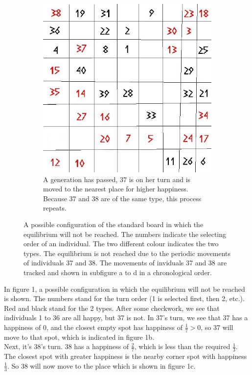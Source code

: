 \begin{figure}[H]
\begin{subfigure}{0.3\textwidth}
        \includegraphics[width=\textwidth]{Tegenvoorbeeld/segregation_tegenvb_3.jpg}
        
        \caption{A generation has passed, 37 is on her turn and is moved to the nearest place for higher happiness. Because 37 and 38 are of the same type, this process repeats. }
        \label{fig:movement4}
    \end{subfigure}
    \caption{A possible configuration of the standard board in which the equilibrium will not be reached. The numbers indicate the selecting order of an individual. The two different colour indicates the two types. The equilibrium is not reached due to the periodic movements of individuals 37 and 38. The movements of inviduals 37 and 38 are tracked and shown in subfigure a to d in a chronological order.}\label{fig:equilibrium counterexample}
\end{figure}
In figure 1, a possible configuration in which the equilibrium will not be reached is shown. The numbers stand for the turn order (1 is selected first, then 2, etc.). Red and black stand for the 2 types. After some checkwork, we see that individuals 1 to 36 are all happy, but 37 is not. In 37's turn, we see that 37 has a happiness of $0$, and the closest empty spot has happiness of $\frac{1}{7} > 0$, so 37 will move to that spot, which is indicated in figure 1b.
\\Next, it's 38's turn. 38 has a happiness of $\frac{2}{7}$, which is less than the required $\frac{1}{3}$. The closest spot with greater happiness is the nearby corner spot with happiness $\frac{1}{3}$. So 38 will now move to the place which is shown in figure 1c.\\
